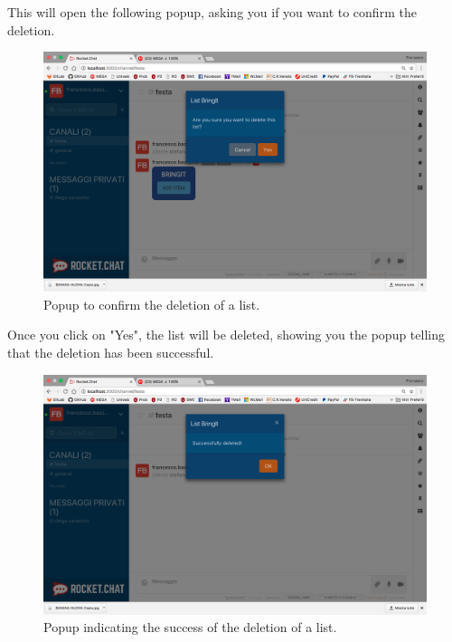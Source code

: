 This will open the following popup, asking you if you want to confirm the deletion.

\begin{figure}[H]
  \centering 
  \includegraphics[width=\textwidth]{Sections/3-HowToUse/Images/popup_delete_confirm.png}
  \caption{Popup to confirm the deletion of a list.}
\end{figure}

Once you click on "Yes", the list will be deleted, showing you the popup telling that the deletion has been successful.

\begin{figure}[H]
  \centering 
  \includegraphics[width=\textwidth]{Sections/3-HowToUse/Images/popup_delete_success.png}
  \caption{Popup indicating the success of the deletion of a list.}
\end{figure}